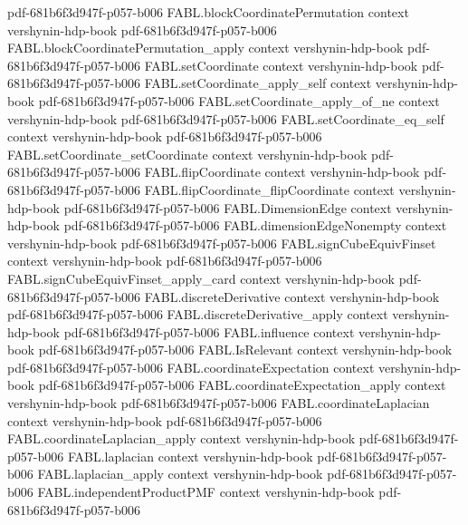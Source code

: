 \begin{theorem}
  {pdf-681b6f3d947f-p057-b006}
\proofstep
  {FABL.blockCoordinatePermutation}
  {context}
  {vershynin-hdp-book}
  {pdf-681b6f3d947f-p057-b006}
\proofstep
  {FABL.blockCoordinatePermutation_apply}
  {context}
  {vershynin-hdp-book}
  {pdf-681b6f3d947f-p057-b006}
\proofstep
  {FABL.setCoordinate}
  {context}
  {vershynin-hdp-book}
  {pdf-681b6f3d947f-p057-b006}
\proofstep
  {FABL.setCoordinate_apply_self}
  {context}
  {vershynin-hdp-book}
  {pdf-681b6f3d947f-p057-b006}
\proofstep
  {FABL.setCoordinate_apply_of_ne}
  {context}
  {vershynin-hdp-book}
  {pdf-681b6f3d947f-p057-b006}
\proofstep
  {FABL.setCoordinate_eq_self}
  {context}
  {vershynin-hdp-book}
  {pdf-681b6f3d947f-p057-b006}
\proofstep
  {FABL.setCoordinate_setCoordinate}
  {context}
  {vershynin-hdp-book}
  {pdf-681b6f3d947f-p057-b006}
\proofstep
  {FABL.flipCoordinate}
  {context}
  {vershynin-hdp-book}
  {pdf-681b6f3d947f-p057-b006}
\proofstep
  {FABL.flipCoordinate_flipCoordinate}
  {context}
  {vershynin-hdp-book}
  {pdf-681b6f3d947f-p057-b006}
\proofstep
  {FABL.DimensionEdge}
  {context}
  {vershynin-hdp-book}
  {pdf-681b6f3d947f-p057-b006}
\proofstep
  {FABL.dimensionEdgeNonempty}
  {context}
  {vershynin-hdp-book}
  {pdf-681b6f3d947f-p057-b006}
\proofstep
  {FABL.signCubeEquivFinset}
  {context}
  {vershynin-hdp-book}
  {pdf-681b6f3d947f-p057-b006}
\proofstep
  {FABL.signCubeEquivFinset_apply_card}
  {context}
  {vershynin-hdp-book}
  {pdf-681b6f3d947f-p057-b006}
\proofstep
  {FABL.discreteDerivative}
  {context}
  {vershynin-hdp-book}
  {pdf-681b6f3d947f-p057-b006}
\proofstep
  {FABL.discreteDerivative_apply}
  {context}
  {vershynin-hdp-book}
  {pdf-681b6f3d947f-p057-b006}
\proofstep
  {FABL.influence}
  {context}
  {vershynin-hdp-book}
  {pdf-681b6f3d947f-p057-b006}
\proofstep
  {FABL.IsRelevant}
  {context}
  {vershynin-hdp-book}
  {pdf-681b6f3d947f-p057-b006}
\proofstep
  {FABL.coordinateExpectation}
  {context}
  {vershynin-hdp-book}
  {pdf-681b6f3d947f-p057-b006}
\proofstep
  {FABL.coordinateExpectation_apply}
  {context}
  {vershynin-hdp-book}
  {pdf-681b6f3d947f-p057-b006}
\proofstep
  {FABL.coordinateLaplacian}
  {context}
  {vershynin-hdp-book}
  {pdf-681b6f3d947f-p057-b006}
\proofstep
  {FABL.coordinateLaplacian_apply}
  {context}
  {vershynin-hdp-book}
  {pdf-681b6f3d947f-p057-b006}
\proofstep
  {FABL.laplacian}
  {context}
  {vershynin-hdp-book}
  {pdf-681b6f3d947f-p057-b006}
\proofstep
  {FABL.laplacian_apply}
  {context}
  {vershynin-hdp-book}
  {pdf-681b6f3d947f-p057-b006}
\proofstep
  {FABL.independentProductPMF}
  {context}
  {vershynin-hdp-book}
  {pdf-681b6f3d947f-p057-b006}

\end{theorem}
